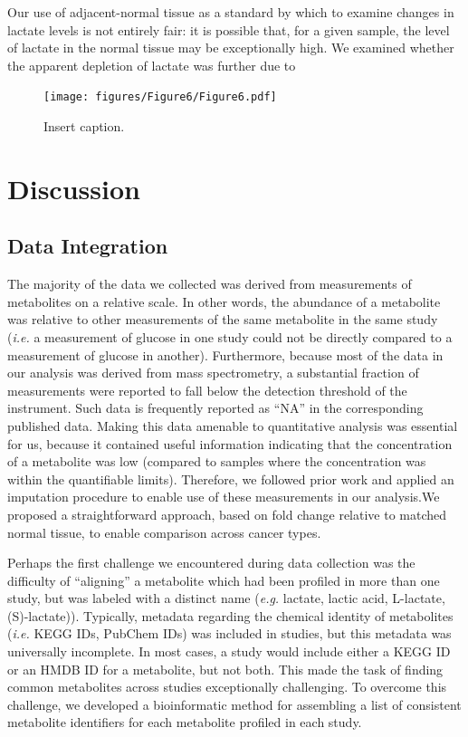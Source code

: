 \documentclass[10pt]{article}
\begin{document}
Our use of adjacent-normal tissue as a standard by which to examine changes in lactate levels is not entirely fair: it is possible that, for a given sample, the level of lactate in the normal tissue may be exceptionally high. We examined whether the apparent depletion of lactate was further due to 

\begin{figure}[ht!]
  \centering
     \texttt{[image: figures/Figure6/Figure6.pdf]}
  \caption{Insert caption. }
     \label{fig:Fig6}
\end{figure}

\section{Discussion}

\subsection{Data Integration}
The majority of the data we collected was derived from measurements of metabolites on a relative scale. In other words, the  abundance of a metabolite was relative to other measurements of the same metabolite in the same study (\textit{i.e.} a measurement of glucose in one study could not be directly compared to a measurement of glucose in another). Furthermore, because most of the data in our analysis was derived from mass spectrometry, a substantial fraction of measurements were reported to fall below the detection threshold of the instrument. Such data is frequently reported as ``NA'' in the corresponding published data. Making this data amenable to quantitative analysis was essential for us, because it contained useful information indicating that the concentration of a metabolite was low (compared to samples where the concentration was within the quantifiable limits). Therefore, we followed prior work and applied an imputation procedure to enable use of these measurements in our analysis.We proposed a straightforward approach, based on fold change relative to matched normal tissue, to enable comparison across cancer types. 

Perhaps the first challenge we encountered during data collection was the difficulty of ``aligning'' a metabolite which had been profiled in more than one study, but was labeled with a distinct name (\textit{e.g.} lactate, lactic acid, L-lactate, (S)-lactate)). Typically, metadata regarding the chemical identity of metabolites (\textit{i.e.} KEGG IDs, PubChem IDs) was included in studies, but this metadata was universally incomplete. In most cases, a study would include either a KEGG ID or an HMDB ID for a metabolite, but not both. This made the task of finding common metabolites across studies exceptionally challenging. To overcome this challenge, we developed a bioinformatic method for assembling a list of consistent metabolite identifiers for each metabolite profiled in each study.
\end{document}
